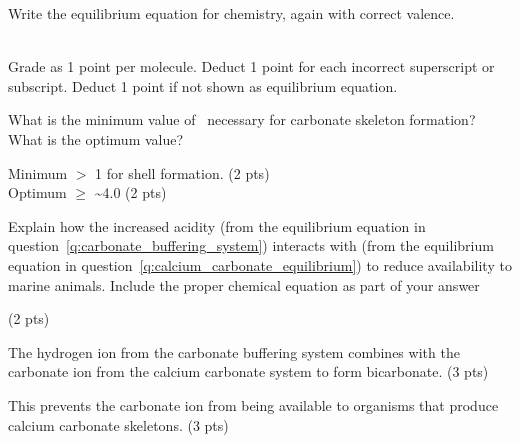 \documentclass[11pt, addpoints]{exam}
\newcommand*\AnswerBox[2]{%
    \parbox[t][#1]{0.92\textwidth}{%
    \begin{solution}#2\end{solution}}
    \vspace*{\stretch{1}}
}
\newenvironment{AnswerPage}[1]
    {\begin{minipage}[t][#1]{0.92\textwidth}%
    \begin{solution}}
    {\end{solution}\end{minipage}
    \vspace*{\stretch{1}}}
\begin{document}
\begin{questions}
\begin{AnswerPage}{0.05\textheight}


\end{AnswerPage}


\question[2] \label{q:calcium_carbonate_equilibrium}
Write the equilibrium equation for  chemistry, again with correct valence.

\AnswerBox{0.05\textheight}{%
   \\
Grade as 1 point per molecule. Deduct 1 point for each incorrect superscript or subscript. Deduct 1 point if not shown as equilibrium equation.
}


\question[5]
What is the minimum value of \Omega\ necessary for carbonate skeleton
formation? What is the optimum value?

\AnswerBox{0.05\textheight}{%
Minimum $>$ 1 for shell formation. (2 pts)\\
Optimum $\ge$ \textasciitilde4.0 (2 pts)
}

\question[6]
Explain how the increased acidity (from the equilibrium equation in
question~\ref{q:carbonate_buffering_system}) interacts with  (from the equilibrium equation in question~\ref{q:calcium_carbonate_equilibrium})
to reduce  availability to marine animals. Include
the proper chemical equation as part of your answer 


\begin{AnswerPage}{0.3\textheight}%

 \qquad (2 pts)

\vspace{\baselineskip}

The hydrogen ion from the carbonate buffering system combines with the carbonate ion from the calcium carbonate system to form bicarbonate. (3 pts) 

This prevents the carbonate ion from being available to organisms that produce calcium carbonate skeletons. (3 pts)

\end{AnswerPage}


\end{questions}
\end{document}

